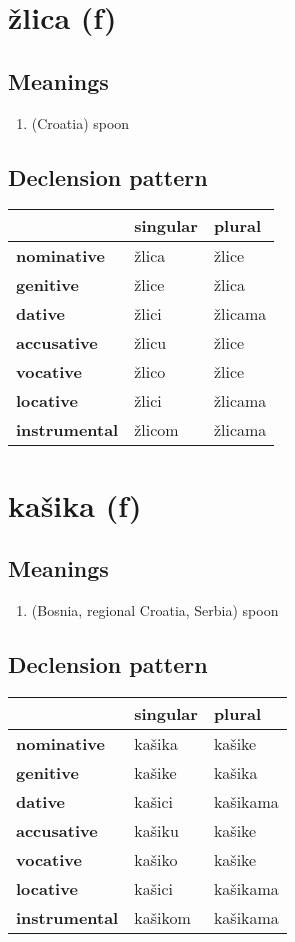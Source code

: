 \filbreak
\section{žlica (f)}
\subsection*{Meanings}
\begin{enumerate}
\item (Croatia) spoon
\end{enumerate}
\subsection*{Declension pattern}
\begin{tabularx}{\linewidth}{Xll}
\toprule
{} & singular &   plural \\
\midrule
\textbf{nominative  } &    žlica &    žlice \\
\textbf{genitive    } &    žlice &    žlica \\
\textbf{dative      } &    žlici &  žlicama \\
\textbf{accusative  } &    žlicu &    žlice \\
\textbf{vocative    } &    žlico &    žlice \\
\textbf{locative    } &    žlici &  žlicama \\
\textbf{instrumental} &   žlicom &  žlicama \\
\bottomrule
\end{tabularx}

\filbreak
\section{kašika (f)}
\subsection*{Meanings}
\begin{enumerate}
\item (Bosnia, regional Croatia, Serbia) spoon
\end{enumerate}
\subsection*{Declension pattern}
\begin{tabularx}{\linewidth}{Xll}
\toprule
{} & singular &    plural \\
\midrule
\textbf{nominative  } &   kašika &    kašike \\
\textbf{genitive    } &   kašike &    kašika \\
\textbf{dative      } &   kašici &  kašikama \\
\textbf{accusative  } &   kašiku &    kašike \\
\textbf{vocative    } &   kašiko &    kašike \\
\textbf{locative    } &   kašici &  kašikama \\
\textbf{instrumental} &  kašikom &  kašikama \\
\bottomrule
\end{tabularx}

